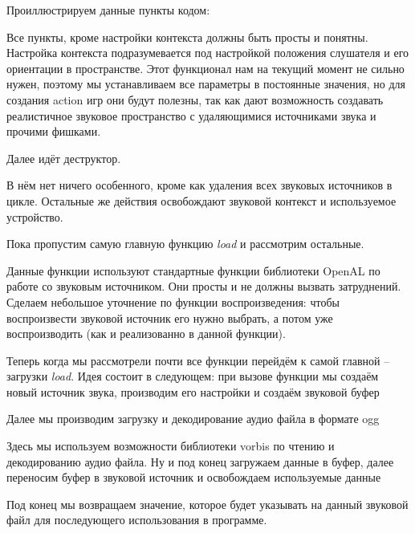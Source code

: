 Проиллюстрируем данные пункты кодом:


Все пункты, кроме настройки контекста должны быть просты и понятны. Настройка контекста подразумевается под 
настройкой положения слушателя и его ориентации в пространстве. Этот функционал нам на текущий момент не 
сильно нужен, поэтому мы устанавливаем все параметры в постоянные значения, но для создания action игр они 
будут полезны, так как дают возможность создавать реалистичное звуковое пространство с удаляющимися 
источниками звука и прочими фишками. 


Далее идёт деструктор. 


В нём нет ничего особенного, кроме как удаления всех звуковых источников в цикле. Остальные же действия 
освобождают звуковой контекст и используемое устройство.

\pagebreak

Пока пропустим самую главную функцию \emph{load} и рассмотрим остальные.


Данные функции используют стандартные функции библиотеки OpenAL по работе со звуковым источником. Они просты 
и не должны вызвать затруднений. Сделаем небольшое уточнение по функции воспроизведения: чтобы воспроизвести 
звуковой источник его нужно выбрать, а потом уже воспроизводить (как и реализованно в данной функции).

Теперь когда мы рассмотрели почти все функции перейдём к самой главной -- загрузки \emph{load}. Идея состоит 
в следующем: при вызове функции мы создаём новый источник звука, производим его настройки и создаём звуковой 
буфер


Далее мы производим загрузку и декодирование аудио файла в формате ogg


Здесь мы используем возможности библиотеки vorbis по чтению и декодированию аудио файла. Ну и под конец 
загружаем данные в буфер, далее переносим буфер в звуковой источник и освобождаем используемые данные


Под конец мы возвращаем значение, которое будет указывать на данный звуковой файл для последующего 
использования в программе.

